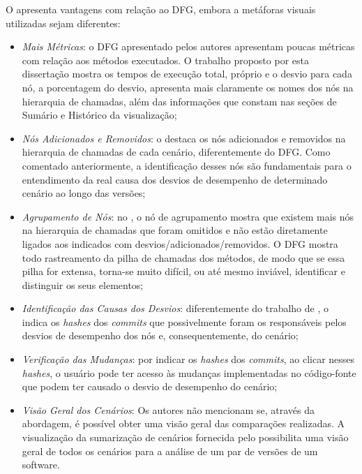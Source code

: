 O {\textit{\toolName}} apresenta vantagens com relação ao DFG, embora a metáforas visuais utilizadas sejam diferentes:
\begin{itemize}
   \item \textit{Mais Métricas}: o DFG apresentado pelos autores apresentam poucas métricas com relação aos métodos executados. O trabalho proposto por esta dissertação mostra os tempos de execução total, próprio e o desvio para cada nó, a porcentagem do desvio, apresenta mais claramente os nomes dos nós na hierarquia de chamadas, além das informações que constam nas seções de Sumário e Histórico da visualização;
   \item \textit{Nós Adicionados e Removidos}: o {\textit{\toolName}} destaca os nós adicionados e removidos na hierarquia de chamadas de cada cenário, diferentemente do DFG. Como comentado anteriormente, a identificação desses nós são fundamentais para o entendimento da real causa dos desvios de desempenho de determinado cenário ao longo das versões;
   \item \textit{Agrupamento de Nós}: no {\textit{\toolName}}, o nó de agrupamento mostra que existem mais nós na hierarquia de chamadas que foram omitidos e não estão diretamente ligados aos indicados com desvios/adicionados/removidos. O DFG mostra todo rastreamento da pilha de chamadas dos métodos, de modo que se essa pilha for extensa, torna-se muito difícil, ou até mesmo inviável, identificar e distinguir os seus elementos;
   \item \textit{Identificação das Causas dos Desvios}: diferentemente do trabalho de \citeauthor{Bezemer2015}, o {\textit{\toolName}} indica os \textit{hashes} dos \textit{commits} que possivelmente foram os responsáveis pelos desvios de desempenho dos nós e, consequentemente, do cenário;
   \item \textit{Verificação das Mudanças}: por indicar os \textit{hashes} dos \textit{commits}, ao clicar nesses \textit{hashes}, o usuário pode ter acesso às mudanças implementadas no código-fonte que podem ter causado o desvio de desempenho do cenário;
   \item \textit{Visão Geral dos Cenários}: Os autores não mencionam se, através da abordagem, é possível obter uma visão geral das comparações realizadas. A visualização da sumarização de cenários fornecida pelo {\textit{\toolName}} possibilita uma visão geral de todos os cenários para a análise de um par de versões de um software.
\end{itemize}